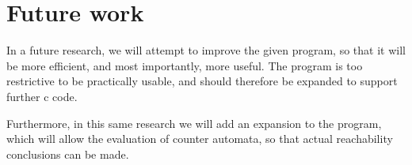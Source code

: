 \documentclass[12pt]{article}
\begin{document}
\section{Future work}
In a future research, we will attempt to improve the given program, so that it will be more efficient, and most importantly, more useful. The program is too restrictive to be practically usable, and should therefore be expanded to support further c code.

Furthermore, in this same research we will add an expansion to the program, which will allow the evaluation of counter automata, so that actual reachability conclusions can be made.
\printbibliography
\end{document}
